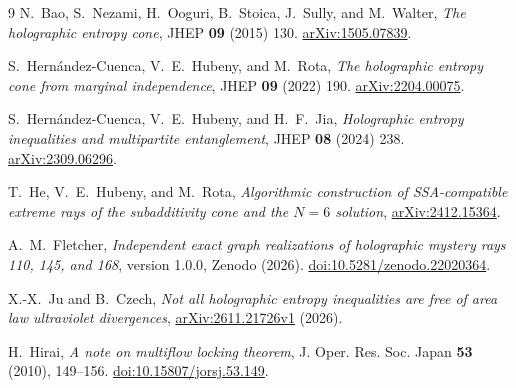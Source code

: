 \documentclass[11pt]{article}
\begin{document}
\begin{thebibliography}{9}
\setlength{\itemsep}{0.26em}
N.~Bao, S.~Nezami, H.~Ooguri, B.~Stoica, J.~Sully, and M.~Walter,
\emph{The holographic entropy cone},
JHEP \textbf{09} (2015) 130.
\href{https://arxiv.org/abs/1505.07839}{arXiv:1505.07839}.

S.~Hern\'andez-Cuenca, V.~E.~Hubeny, and M.~Rota,
\emph{The holographic entropy cone from marginal independence},
JHEP \textbf{09} (2022) 190.
\href{https://arxiv.org/abs/2204.00075}{arXiv:2204.00075}.

S.~Hern\'andez-Cuenca, V.~E.~Hubeny, and H.~F.~Jia,
\emph{Holographic entropy inequalities and multipartite entanglement},
JHEP \textbf{08} (2024) 238.
\href{https://arxiv.org/abs/2309.06296}{arXiv:2309.06296}.

T.~He, V.~E.~Hubeny, and M.~Rota,
\emph{Algorithmic construction of SSA-compatible extreme rays of the
subadditivity cone and the \(N=6\) solution},
\href{https://arxiv.org/abs/2412.15364}{arXiv:2412.15364}.

A.~M.~Fletcher,
\emph{Independent exact graph realizations of holographic mystery
rays 110, 145, and 168}, version 1.0.0,
Zenodo (2026).
\href{https://doi.org/10.5281/zenodo.22020364}{doi:10.5281/zenodo.22020364}.

X.-X.~Ju and B.~Czech,
\emph{Not all holographic entropy inequalities are free of area law
ultraviolet divergences},
\href{https://arxiv.org/abs/2611.21726v1}{arXiv:2611.21726v1} (2026).

H.~Hirai, \emph{A note on multiflow locking theorem},
J. Oper. Res. Soc. Japan \textbf{53} (2010), 149--156.
\href{https://doi.org/10.15807/jorsj.53.149}{doi:10.15807/jorsj.53.149}.
\end{thebibliography}
\end{document}
